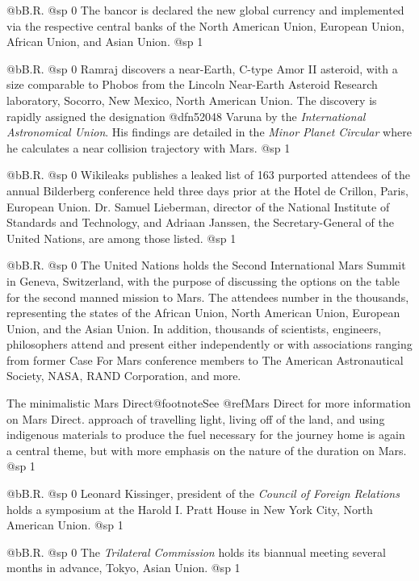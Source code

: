@b{B.R.}
@sp 0
The bancor is declared the new global currency and implemented via the respective central banks of the North American Union, European Union, African Union, and Asian Union.
@sp 1

@b{B.R.}
@sp 0
Ramraj discovers a near-Earth, C-type Amor II asteroid, with a size comparable to Phobos from the Lincoln Near-Earth Asteroid Research laboratory, Socorro, New Mexico, North American Union. The discovery is rapidly assigned the designation @dfn{52048 Varuna} by the {\it International Astronomical Union}. His findings are detailed in the {\it Minor Planet Circular} where he calculates a near collision trajectory with Mars.
@sp 1

@b{B.R.}
@sp 0
Wikileaks publishes a leaked list of 163 purported attendees of the annual Bilderberg conference held three days prior at the Hotel de Crillon, Paris, European Union. Dr. Samuel Lieberman, director of the National Institute of Standards and Technology, and Adriaan Janssen, the Secretary-General of the United Nations, are among those listed.
@sp 1

@b{B.R.}
@sp 0
The United Nations holds the Second International Mars Summit in Geneva, Switzerland, with the purpose of discussing the options on the table for the second manned mission to Mars. The attendees number in the thousands, representing the states of the African Union, North American Union, European Union, and the Asian Union. In addition, thousands of scientists, engineers, philosophers attend and present either independently or with associations ranging from former Case For Mars conference members to The American Astronautical Society, NASA, RAND Corporation, and more.

The minimalistic Mars Direct@footnote{See @ref{Mars Direct} for more information on Mars Direct.} approach of travelling light, living off of the land, and using indigenous materials to produce the fuel necessary for the journey home is again a central theme, but with more emphasis on the nature of the duration on Mars.
@sp 1

@b{B.R.}
@sp 0
Leonard Kissinger, president of the {\it Council of Foreign Relations} holds a symposium at the Harold I. Pratt House in New York City, North American Union.
@sp 1

@b{B.R.}
@sp 0
The {\it Trilateral Commission} holds its biannual meeting several months in advance, Tokyo, Asian Union.
@sp 1


